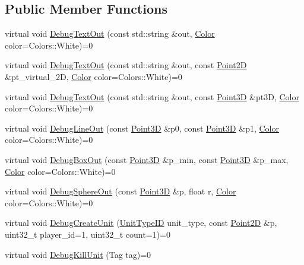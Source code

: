 \subsection*{Public Member Functions}
\begin{DoxyCompactItemize}
\item 
virtual void \hyperlink{classsc2_1_1_debug_interface_a3edaf8b4f0e0155f3b8eaf2cf672ee29}{Debug\+Text\+Out} (const std\+::string \&out, \hyperlink{structsc2_1_1_color}{Color} color=Colors\+::\+White)=0
\item 
virtual void \hyperlink{classsc2_1_1_debug_interface_a5044b5772c931b1115fd3ec40682a257}{Debug\+Text\+Out} (const std\+::string \&out, const \hyperlink{structsc2_1_1_point2_d}{Point2D} \&pt\+\_\+virtual\+\_\+2D, \hyperlink{structsc2_1_1_color}{Color} color=Colors\+::\+White)=0
\item 
virtual void \hyperlink{classsc2_1_1_debug_interface_a8037bf4a4941d49c372c6e73dfe4663c}{Debug\+Text\+Out} (const std\+::string \&out, const \hyperlink{structsc2_1_1_point3_d}{Point3D} \&pt3D, \hyperlink{structsc2_1_1_color}{Color} color=Colors\+::\+White)=0
\item 
virtual void \hyperlink{classsc2_1_1_debug_interface_a3d2232ee51265c7b97f7692ec7918ca1}{Debug\+Line\+Out} (const \hyperlink{structsc2_1_1_point3_d}{Point3D} \&p0, const \hyperlink{structsc2_1_1_point3_d}{Point3D} \&p1, \hyperlink{structsc2_1_1_color}{Color} color=Colors\+::\+White)=0
\item 
virtual void \hyperlink{classsc2_1_1_debug_interface_ab4e7e911795e9e59fca953b5c6d71b22}{Debug\+Box\+Out} (const \hyperlink{structsc2_1_1_point3_d}{Point3D} \&p\+\_\+min, const \hyperlink{structsc2_1_1_point3_d}{Point3D} \&p\+\_\+max, \hyperlink{structsc2_1_1_color}{Color} color=Colors\+::\+White)=0
\item 
virtual void \hyperlink{classsc2_1_1_debug_interface_a9c4b50b0c3b07cd77c4b9c98afc689b0}{Debug\+Sphere\+Out} (const \hyperlink{structsc2_1_1_point3_d}{Point3D} \&p, float r, \hyperlink{structsc2_1_1_color}{Color} color=Colors\+::\+White)=0
\item 
virtual void \hyperlink{classsc2_1_1_debug_interface_a74f53226964fac1ff67f071b09497a8a}{Debug\+Create\+Unit} (\hyperlink{classsc2_1_1_s_c2_type}{Unit\+Type\+ID} unit\+\_\+type, const \hyperlink{structsc2_1_1_point2_d}{Point2D} \&p, uint32\+\_\+t player\+\_\+id=1, uint32\+\_\+t count=1)=0
\item 
virtual void \hyperlink{classsc2_1_1_debug_interface_afc45d89e7cd2bc02c9be1808a0041be2}{Debug\+Kill\+Unit} (Tag tag)=0

\end{DoxyCompactItemize}
